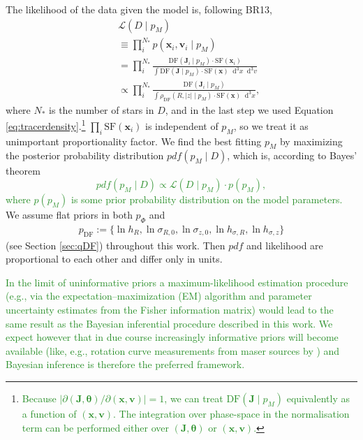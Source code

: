 \documentclass[iop,revtex4]{emulateapj}
\newcommand{\vect}[1]{\boldsymbol{#1}}
\newcommand*\Diff[1]{\mathop{}\!\mathrm{d^#1}}
\newcommand{\pdf}{\ensuremath{pdf}}
\newcommand{\pmodel}{\ensuremath{p_M}}
\newcommand{\NEW}[1]{\textcolor{ForestGreen}{#1}}
\newcommand{\OLD}[1]{}
\begin{document}
The likelihood of the data given the model is, following BR13,
\begin{eqnarray}
&&\mathscr{L}(D \mid \pmodel) \nonumber\\
&&\equiv \prod_i^{N_*} p(\vect{x}_i,\vect{v}_i \mid \pmodel) \nonumber\\
&&= \prod_i^{N_*} \frac{\text{DF}(\vect{J}_i \mid \pmodel) \cdot \text{SF}(\vect{x}_i)}{\int  \text{DF}(\vect{J} \mid \pmodel) \cdot \text{SF}(\vect{x})  \Diff 3 x \Diff 3 v}\nonumber\\
&&\propto \prod_i^{N_*} \frac{\text{DF}(\vect{J}_i \mid \pmodel)}{\int \rho_\text{DF}(R,|z| \mid \pmodel) \cdot \text{SF}(\vect{x}) \Diff 3 x}, \label{eq:prob}
\end{eqnarray}
where $N_*$ is the number of stars in $D$, and in the last step we used Equation \eqref{eq:tracerdensity}.\footnote{\NEW{Because $\left| \partial(\vect{J},\vect{\theta}) / \partial (\vect{x},\vect{v}) \right| = 1$, we can treat $\text{DF}(\vect{J} \mid \pmodel)$ equivalently as a function of $(\vect{x},\vect{v})$. The integration over phase-space in the normalisation term can be performed either over $(\vect{J},\vect{\theta})$ or $(\vect{x},\vect{v})$.}} $\prod_i\text{SF}(\vect{x}_i)$ is independent of \pmodel{}, so we treat it as unimportant proportionality factor. We find the best fitting \pmodel{} by maximizing the posterior probability distribution $\pdf{}(\pmodel \mid D)$, which is, according to Bayes' theorem\OLD{, proportional to the likelihood $\mathscr{L}(D\mid \pmodel)$ times a prior $p(\pmodel)$.}\NEW{
\begin{equation*}
\pdf{}(\pmodel \mid D) \propto \mathscr{L}(D\mid \pmodel) \cdot p(\pmodel),
\end{equation*}
where $p(\pmodel)$ is some prior probability distribution on the model parameters.} We assume flat priors in both $p_\Phi$ and
\begin{eqnarray}
p_\text{DF} := \{ \ln h_R, \ln \sigma_{R,0}, \ln \sigma_{z,0}, \ln h_{\sigma,R}, \ln h_{\sigma,z} \} \label{eq:p_DF}
\end{eqnarray}
(see Section \ref{sec:qDF}) throughout this work. Then \pdf{} and likelihood are proportional to each other and differ only in units.

\NEW{In the limit of uninformative priors a maximum-likelihood estimation procedure (e.g., via the expectation–maximization (EM) algorithm and parameter uncertainty estimates from the Fisher information matrix) would lead to the same result as the Bayesian inferential procedure described in this work. We expect however that in due course increasingly informative priors will become available (like, e.g., rotation curve measurements from maser sources by \citet{2009ApJ...700..137R}) and Bayesian inference is therefore the preferred framework.}
\end{document}
